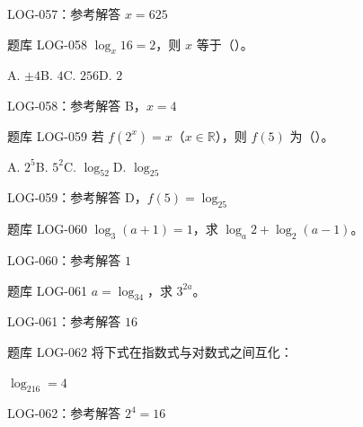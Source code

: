 \documentclass[aspectratio=169,10pt]{beamer}
\begin{document}
\ifdefined\TeacherEdition
\begin{frame}[t]{LOG-057：参考解答}
$x=625$
\end{frame}
\fi

\begin{campuspractice}{题库 LOG-058}
$\log_x16=2$，则 $x$ 等于（\quad）。\par A. $\pm4$\quad B. $4$\quad C. $256$\quad D. $2$
\end{campuspractice}

\ifdefined\TeacherEdition
\begin{frame}[t]{LOG-058：参考解答}
B，$x=4$
\end{frame}
\fi

\begin{campuspractice}{题库 LOG-059}
若 $f(2^x)=x$（$x\in\mathbb R$），则 $f(5)$ 为（\quad）。\par A. $2^5$\quad B. $5^2$\quad C. $\log_52$\quad D. $\log_25$
\end{campuspractice}

\ifdefined\TeacherEdition
\begin{frame}[t]{LOG-059：参考解答}
D，$f(5)=\log_25$
\end{frame}
\fi

\begin{campuspractice}{题库 LOG-060}
$\log_3(a+1)=1$，求 $\log_a2+\log_2(a-1)$。
\end{campuspractice}

\ifdefined\TeacherEdition
\begin{frame}[t]{LOG-060：参考解答}
$1$
\end{frame}
\fi

\begin{campuspractice}{题库 LOG-061}
$a=\log_34$，求 $3^{2a}$。
\end{campuspractice}

\ifdefined\TeacherEdition
\begin{frame}[t]{LOG-061：参考解答}
$16$
\end{frame}
\fi

\begin{campuspractice}{题库 LOG-062}
将下式在指数式与对数式之间互化：\par
$\log_216=4$
\end{campuspractice}

\ifdefined\TeacherEdition
\begin{frame}[t]{LOG-062：参考解答}
$2^4=16$
\end{frame}
\fi
\end{document}
